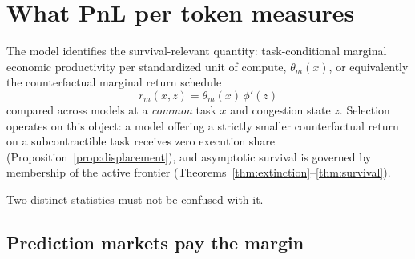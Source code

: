 \documentclass[11pt]{article}
\theoremstyle{definition}
\theoremstyle{remark}
\begin{document}
\section{What PnL per token measures}
\label{sec:measure}

The model identifies the survival-relevant quantity: task-conditional marginal economic productivity per standardized unit of compute, $\theta_m(x)$, or equivalently the counterfactual marginal return schedule
\begin{equation}
r_{m}(x, z) = \theta_m(x)\, \phi'(z)
\end{equation}
compared across models at a \emph{common} task $x$ and congestion state $z$. Selection operates on this object: a model offering a strictly smaller counterfactual return on a subcontractible task receives zero execution share (Proposition~\ref{prop:displacement}), and asymptotic survival is governed by membership of the active frontier (Theorems~\ref{thm:extinction}--\ref{thm:survival}).

Two distinct statistics must not be confused with it.

\subsection{Prediction markets pay the margin}
\end{document}
